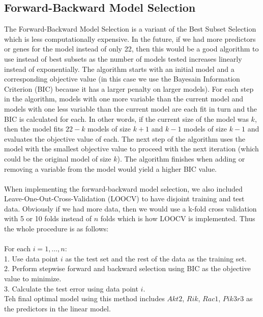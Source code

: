 \documentclass{article}
\begin{document}
\subsection{Forward-Backward Model Selection}
The Forward-Backward Model Selection is a variant of the Best Subset Selection which is less computationally expensive.  In the future, if we had more predictors or genes for the model instead of only 22, then this would be a good algorithm to use instead of best subsets as the number of models tested increases linearly instead of exponentially.  The algorithm starts with an initial model and a corresponding objective value (in this case we use the Bayesain Information Criterion (BIC) because it has a larger penalty on larger models).  For each step in the algorithm, models with one more variable than the current model and models with one less variable than the current model are each fit in turn and the BIC is calculated for each.  In other words, if the current size of the model was $k$, then the model fits $22-k$ models of size $k+1$ and $k-1$ models of size $k-1$ and evaluates the objective value of each.  The next step of the algorithm uses the model with the smallest objective value to proceed with the next iteration (which could be the original model of size $k$).  The algorithm finishes when adding or removing a variable from the model would yield a higher BIC value.\\
\null\\
When implementing the forward-backward model selection, we also included Leave-One-Out-Cross-Validation (LOOCV) to have disjoint training and test data.  Obviously if we had more data, then we would use a k-fold cross validation with 5 or 10 folds instead of $n$ folds which is how LOOCV is implemented.  Thus the whole procedure is as follows:\\
\null\\
For each $i=1,\dots, n$:\\
1. Use data point $i$ as the test set and the rest of the data as the training set.\\
2. Perform stepwise forward and backward selection using BIC as the objective value to minimize.\\
3. Calculate the test error using data point $i$. \\
Teh final optimal model using this method includes $Akt2$, $Rik$, $Rac1$, $Pik3r3$ as the predictors in the linear model.
\end{document}
